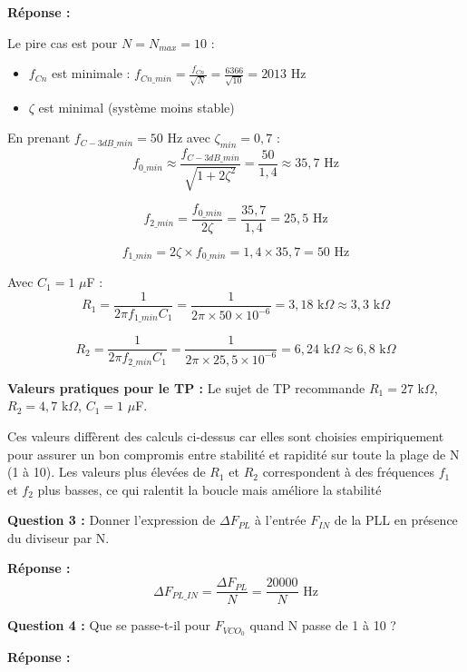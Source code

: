 \documentclass[a4paper,11pt]{article}
\begin{document}
\vspace{0.3cm}
\textbf{Réponse :}

Le pire cas est pour $N = N_{max} = 10$ :
\begin{itemize}
    \item $f_{Cn}$ est minimale : $f_{Cn\_min} = \frac{f_{Cn}}{\sqrt{N}} = \frac{6366}{\sqrt{10}} = \boxed{2013 \text{ Hz}}$
    \item $\zeta$ est minimal (système moins stable)
\end{itemize}

En prenant $f_{C-3dB\_min} = 50$ Hz avec $\zeta_{min} = 0{,}7$ :
\[
f_{0\_min} \approx \frac{f_{C-3dB\_min}}{\sqrt{1 + 2\zeta^2}} = \frac{50}{1{,}4} \approx 35{,}7 \text{ Hz}
\]

\[
f_{2\_min} = \frac{f_{0\_min}}{2\zeta} = \frac{35{,}7}{1{,}4} = \boxed{25{,}5 \text{ Hz}}
\]

\[
f_{1\_min} = 2\zeta \times f_{0\_min} = 1{,}4 \times 35{,}7 = \boxed{50 \text{ Hz}}
\]

Avec $C_1 = 1$ $\mu$F :
\[
R_1 = \frac{1}{2\pi f_{1\_min} C_1} = \frac{1}{2\pi \times 50 \times 10^{-6}} = \boxed{3{,}18 \text{ k}\Omega} \approx 3{,}3 \text{ k}\Omega
\]

\[
R_2 = \frac{1}{2\pi f_{2\_min} C_1} = \frac{1}{2\pi \times 25{,}5 \times 10^{-6}} = \boxed{6{,}24 \text{ k}\Omega} \approx 6{,}8 \text{ k}\Omega
\]

\textbf{Valeurs pratiques pour le TP :} Le sujet de TP recommande $R_1 = 27$ k$\Omega$, $R_2 = 4{,}7$ k$\Omega$, $C_1 = 1$ $\mu$F.

Ces valeurs diffèrent des calculs ci-dessus car elles sont choisies empiriquement pour assurer un bon compromis entre stabilité et rapidité sur toute la plage de N (1 à 10). Les valeurs plus élevées de $R_1$ et $R_2$ correspondent à des fréquences $f_1$ et $f_2$ plus basses, ce qui ralentit la boucle mais améliore la stabilité

\vspace{0.5cm}
\textbf{Question 3 :} Donner l'expression de $\Delta F_{PL}$ à l'entrée $F_{IN}$ de la PLL en présence du diviseur par N.

\vspace{0.3cm}
\textbf{Réponse :}
\[
\boxed{\Delta F_{PL\_IN} = \frac{\Delta F_{PL}}{N} = \frac{20000}{N} \text{ Hz}}
\]

\vspace{0.5cm}
\textbf{Question 4 :} Que se passe-t-il pour $F_{VCO_0}$ quand N passe de 1 à 10 ?

\vspace{0.3cm}
\textbf{Réponse :}
\end{document}
